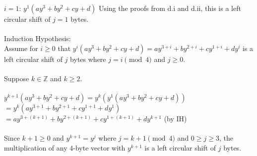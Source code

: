 \documentclass{assignment}
\begin{document}
\begin{problemlist}
\begin{problem}
\begin{answer}
$i=1$: $y^1(ay^3+by^2+cy+d)$  Using the proofs from d.i and d.ii, this is a left circular shift of $j=1$ bytes.\\
\\
Induction Hypothesis:\\
Assume for $i\geq 0$ that $y^i(ay^3+by^2+cy+d)=ay^{3+i}+by^{2+i}+cy^{1+i}+dy^i$ is a left circular shift of $j$ bytes where $j=i \pmod 4$ and $j\geq 0$.\\
\\
Suppose $k \in \mathbb{Z}$ and $k \geq 2$.\\
\\
$y^{k+1}(ay^3+by^2+cy+d)= y^k(y^1(ay^3+by^2+cy+d))$\\
$= y^k(ay^{3+1}+by^{2+1}+cy^{1+1}+dy^{1})$\\
$= ay^{3+(k+1)}+by^{2+(k+1)}+cy^{1+(k+1)}+dy^{k+1}$ (by IH)\\
\\
Since $k+1\geq 0$ and $y^{k+1}=y^j$ where $j=k+1 \pmod 4$ and $0\geq j\geq 3$, the multiplication of any 4-byte vector with $y^{k+1}$ is a left circular shift of $j$ bytes.\\
\\
\end{answer}
\end{problem}


\end{problemlist}
\end{document}
